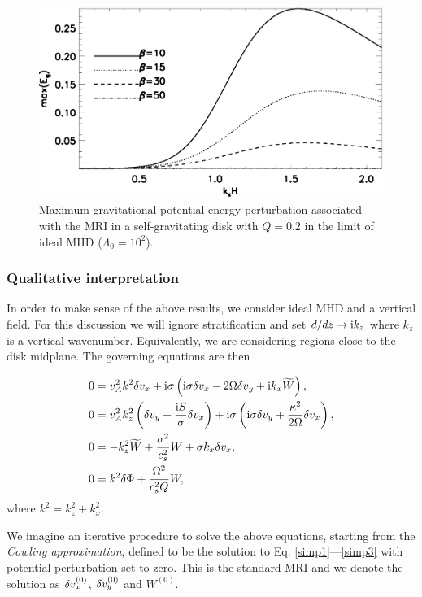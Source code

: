 \begin{figure}
  \includegraphics[width=\linewidth]{figures/compare_energy_ideal}
  \caption{Maximum gravitational potential energy perturbation
    associated with the MRI in a self-gravitating disk with $Q=0.2$ in
    the limit of ideal MHD ($\Lambda_0=10^2$). 
    \label{gravity_energy}}
\end{figure}





\subsubsection{Qualitative interpretation} 
In order to make sense of the above results, we consider ideal MHD and
a vertical field. For this discussion we will ignore stratification
and set $d/dz\to \mathrm{i} k_z$ where $k_z$ is a vertical 
wavenumber. Equivalently, we are considering regions close to the disk
midplane. The governing equations are then

\begin{align}
  &  0= v_A^2k^2\delta v_x + \mathrm{i}\sigma\left(\mathrm{i}\sigma \delta v_x - 2\Omega\delta v_y + \mathrm{i} k_x \widetilde{W}\right),\label{simp1}\\
  &  0= v_A^2k_z^2\left(\delta v_y + \frac{\mathrm{i} S
  }{\sigma}\delta v_x\right) + \mathrm{i}\sigma\left(\mathrm{i}\sigma\delta v_y +
  \frac{\kappa^2}{2\Omega}\delta v_x\right),\\
  & 0 = -k_z^2\widetilde{W} + \frac{\sigma^2}{c_s^2}W + \sigma k_x \delta v_x, \label{simp3}\\
  & 0 = k^2\delta \Phi + \frac{\Omega^2}{c_s^2Q}W,\label{simp4}
\end{align}
where $k^2 = k_z^2 + k_x^2$. 

We imagine an iterative procedure to solve the above equations,
starting from the \emph{Cowling approximation}, defined to be the
solution to Eq. \ref{simp1}---\ref{simp3} with potential perturbation
set to zero. This is the standard MRI and we denote the solution as
$\delta v_x^{(0)}$, $\delta v_y^{(0)}$ and $W^{(0)}$. 

